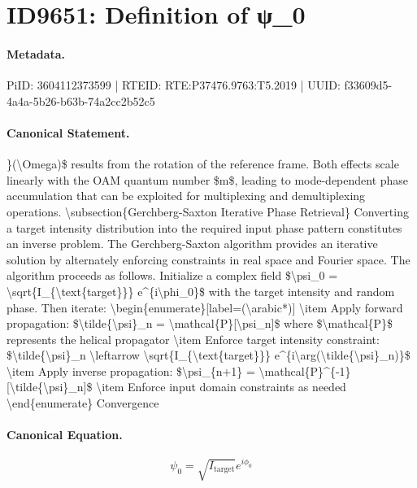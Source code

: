 \section*{ID9651: Definition of ψ\_0}
\paragraph{Metadata.}
PiID: 3604112373599 | RTEID: RTE:P37476.9763:T5.2019 | UUID: f33609d5-4a4a-5b26-b63b-74a2cc2b52c5

\paragraph{Canonical Statement.}
\}(\textbackslash{}Omega)\$ results from the rotation of the reference frame. Both effects scale linearly with the OAM quantum number \$m\$, leading to mode-dependent phase accumulation that can be exploited for multiplexing and demultiplexing operations. \textbackslash{}subsection\{Gerchberg-Saxton Iterative Phase Retrieval\} Converting a target intensity distribution into the required input phase pattern constitutes an inverse problem. The Gerchberg-Saxton algorithm provides an iterative solution by alternately enforcing constraints in real space and Fourier space. The algorithm proceeds as follows. Initialize a complex field \$\textbackslash{}psi\_0 = \textbackslash{}sqrt\{I\_\{\textbackslash{}text\{target\}\}\} e\textasciicircum{}\{i\textbackslash{}phi\_0\}\$ with the target intensity and random phase. Then iterate: \textbackslash{}begin\{enumerate\}[label=(\textbackslash{}arabic*)] \textbackslash{}item Apply forward propagation: \$\textbackslash{}tilde\{\textbackslash{}psi\}\_n = \textbackslash{}mathcal\{P\}[\textbackslash{}psi\_n]\$ where \$\textbackslash{}mathcal\{P\}\$ represents the helical propagator \textbackslash{}item Enforce target intensity constraint: \$\textbackslash{}tilde\{\textbackslash{}psi\}\_n \textbackslash{}leftarrow \textbackslash{}sqrt\{I\_\{\textbackslash{}text\{target\}\}\} e\textasciicircum{}\{i\textbackslash{}arg(\textbackslash{}tilde\{\textbackslash{}psi\}\_n)\}\$ \textbackslash{}item Apply inverse propagation: \$\textbackslash{}psi\_\{n+1\} = \textbackslash{}mathcal\{P\}\textasciicircum{}\{-1\}[\textbackslash{}tilde\{\textbackslash{}psi\}\_n]\$ \textbackslash{}item Enforce input domain constraints as needed \textbackslash{}end\{enumerate\} Convergence

\paragraph{Canonical Equation.}
\[
\psi_0 = \sqrt{I_{\text{target}}} e^{i\phi_0}
\]

